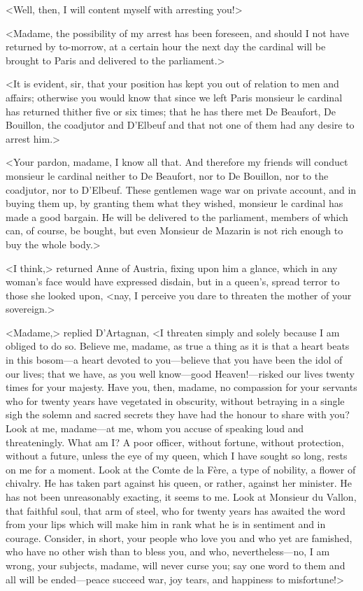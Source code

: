 <Well, then, I will content myself with arresting you!>

<Madame, the possibility of my arrest has been foreseen, and should I not have returned by to-morrow, at a certain hour the next day the cardinal will be brought to Paris and delivered to the parliament.>

<It is evident, sir, that your position has kept you out of relation to men and affairs; otherwise you would know that since we left Paris monsieur le cardinal has returned thither five or six times; that he has there met De Beaufort, De Bouillon, the coadjutor and D'Elbeuf and that not one of them had any desire to arrest him.>

<Your pardon, madame, I know all that. And therefore my friends will conduct monsieur le cardinal neither to De Beaufort, nor to De Bouillon, nor to the coadjutor, nor to D'Elbeuf. These gentlemen wage war on private account, and in buying them up, by granting them what they wished, monsieur le cardinal has made a good bargain. He will be delivered to the parliament, members of which can, of course, be bought, but even Monsieur de Mazarin is not rich enough to buy the whole body.>

<I think,> returned Anne of Austria, fixing upon him a glance, which in any woman's face would have expressed disdain, but in a queen's, spread terror to those she looked upon, <nay, I perceive you dare to threaten the mother of your sovereign.>

<Madame,> replied D'Artagnan, <I threaten simply and solely because I am obliged to do so. Believe me, madame, as true a thing as it is that a heart beats in this bosom—a heart devoted to you—believe that you have been the idol of our lives; that we have, as you well know—good Heaven!—risked our lives twenty times for your majesty. Have you, then, madame, no compassion for your servants who for twenty years have vegetated in obscurity, without betraying in a single sigh the solemn and sacred secrets they have had the honour to share with you? Look at me, madame—at me, whom you accuse of speaking loud and threateningly. What am I? A poor officer, without fortune, without protection, without a future, unless the eye of my queen, which I have sought so long, rests on me for a moment. Look at the Comte de la Fère, a type of nobility, a flower of chivalry. He has taken part against his queen, or rather, against her minister. He has not been unreasonably exacting, it seems to me. Look at Monsieur du Vallon, that faithful soul, that arm of steel, who for twenty years has awaited the word from your lips which will make him in rank what he is in sentiment and in courage. Consider, in short, your people who love you and who yet are famished, who have no other wish than to bless you, and who, nevertheless—no, I am wrong, your subjects, madame, will never curse you; say one word to them and all will be ended—peace succeed war, joy tears, and happiness to misfortune!>

